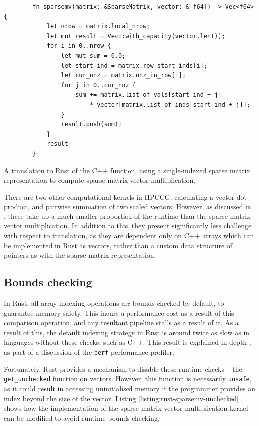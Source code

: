 \begin{code}
    \begin{verbatim}
        fn sparsemv(matrix: &SparseMatrix, vector: &[f64]) -> Vec<f64> {
            let nrow = matrix.local_nrow;
            let mut result = Vec::with_capacity(vector.len());
            for i in 0..nrow {
                let mut sum = 0.0;
                let start_ind = matrix.row_start_inds[i];
                let cur_nnz = matrix.nnz_in_row[i];
                for j in 0..cur_nnz {
                    sum += matrix.list_of_vals[start_ind + j]
                        * vector[matrix.list_of_inds[start_ind + j]];
                }
                result.push(sum);
            }
            result
        }
    \end{verbatim}
    \caption{A translation to Rust of the C++ function, using a single-indexed sparse matrix representation to compute sparse matrix-vector multiplication.}
    \label{listing:rust-sparsemv-indexed}
\end{code}

There are two other computational kernels in HPCCG: calculating a vector dot product, and pairwise summation of two scaled vectors. However, as discussed in , these take up a much smaller proportion of the runtime than the sparse matrix-vector multiplication. In addition to this, they present significantly less challenge with respect to translation, as they are dependent only on C++ arrays which can be implemented in Rust as vectors, rather than a custom data structure of pointers as with the sparse matrix representation.

\subsection{Bounds checking}
\label{sec:translation-bounds-checking}

In Rust, all array indexing operations are bounds checked by default, to guarantee memory safety. This incurs a performance cost as a result of this comparison operation, and any resultant pipeline stalls as a result of it. As a result of this, the default indexing strategy in Rust is around twice as slow as in languages without these checks, such as C++. This result is explained in depth , as part of a discussion of the \texttt{perf} performance profiler.

Fortunately, Rust provides a mechanism to disable these runtime checks -- the \texttt{get_unchecked} function on vectors. However, this function is necessarily \texttt{unsafe}, as it could result in accessing uninitialised memory if the programmer provides an index beyond the size of the vector. Listing \ref{listing:rust-sparsemv-unchecked} shows how the implementation of the sparse matrix-vector multiplication kernel can be modified to avoid runtime bounds checking.

